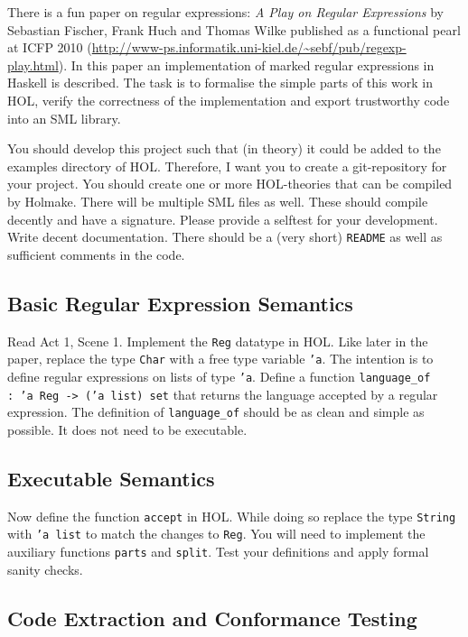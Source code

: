 \documentclass[a4paper,10pt,oneside]{scrartcl}
\begin{document}
There is a fun paper on regular expressions: \emph{A Play on Regular
  Expressions} by Sebastian Fischer, Frank Huch and Thomas Wilke
published as a functional pearl at ICFP 2010
(\url{http://www-ps.informatik.uni-kiel.de/~sebf/pub/regexp-play.html}).
In this paper an implementation of marked regular expressions in
Haskell is described. The task is to formalise the simple parts of
this work in HOL, verify the correctness of the implementation and
export trustworthy code into an SML library.

You should develop this project such that (in theory) it could be
added to the examples directory of HOL. Therefore, I want you to
create a git-repository for your project. You
should create one or more HOL-theories that can be compiled by
Holmake. There will be multiple SML files as well. These should
compile decently and have a signature. Please provide a selftest for
your development. Write decent documentation. There should be a (very
short) \texttt{README} as well as sufficient comments in the code.



\subsection{Basic Regular Expression Semantics}

Read Act 1, Scene 1. Implement the \texttt{Reg} datatype in HOL. Like later in the paper,
replace the type \texttt{Char} with a free type variable \texttt{'a}. The intention is to define
regular expressions on lists of type \texttt{'a}. Define a function \texttt{language\_of :\ 'a Reg -> ('a list) set} that returns the language accepted by a regular expression. The definition of
\texttt{language\_of} should be as clean and simple as possible. It does not need to be executable.

\subsection{Executable Semantics}
Now define the function \texttt{accept} in HOL. While doing so replace the type \texttt{String} with \texttt{'a list} to match the changes to \texttt{Reg}. You will need to implement the auxiliary functions \texttt{parts} and \texttt{split}. Test your definitions and apply formal sanity checks.

\subsection{Code Extraction and Conformance Testing}
\end{document}
